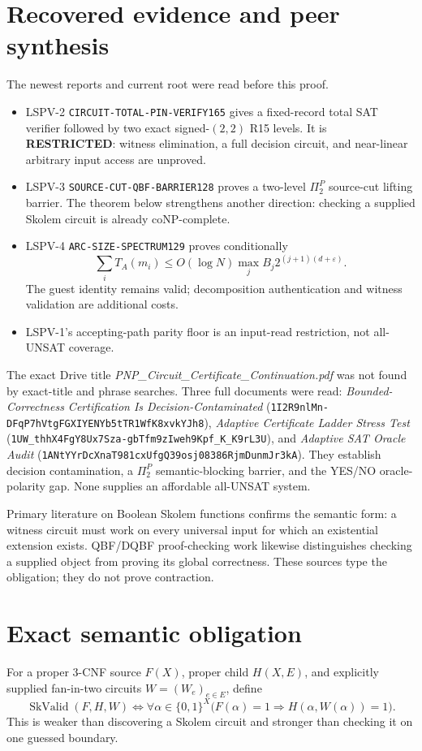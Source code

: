 \documentclass[11pt]{article}
\newcommand{\status}[1]{\textbf{#1}}
\begin{document}
\section*{Recovered evidence and peer synthesis}
The newest reports and current root were read before this proof.
\begin{itemize}
\item LSPV-2 \texttt{CIRCUIT-TOTAL-PIN-VERIFY165} gives a fixed-record
total SAT verifier followed by two exact signed-$(2,2)$ R15 levels.  It is
\status{RESTRICTED}: witness elimination, a full decision circuit, and
near-linear arbitrary input access are unproved.
\item LSPV-3 \texttt{SOURCE-CUT-QBF-BARRIER128} proves a two-level
$\Pi_2^P$ source-cut lifting barrier.  The theorem below strengthens another
direction: checking a supplied Skolem circuit is already coNP-complete.
\item LSPV-4 \texttt{ARC-SIZE-SPECTRUM129} proves conditionally
\[
 \sum_iT_A(m_i)\le O(\log N)\max_jB_j2^{(j+1)(d+\varepsilon)}.
\]
The guest identity remains valid; decomposition authentication and witness
validation are additional costs.
\item LSPV-1's accepting-path parity floor is an input-read restriction, not
all-UNSAT coverage.
\end{itemize}

The exact Drive title \emph{PNP\_Circuit\_Certificate\_Continuation.pdf} was
not found by exact-title and phrase searches.  Three full documents were read:
\emph{Bounded-Correctness Certification Is Decision-Contaminated}
(\texttt{1I2R9nlMn-DFqP7hVtgFGXIYENYb5tTR1WfK8xvkYJh8}),
\emph{Adaptive Certificate Ladder Stress Test}
(\texttt{1UW\_thhX4FgY8Ux7Sza-gbTfm9zIweh9Kpf\_K\_K9rL3U}), and
\emph{Adaptive SAT Oracle Audit}
(\texttt{1ANtYYrDcXnaT981cxUfgQ39osj08386RjmDunmJr3kA}).  They establish
decision contamination, a $\Pi_2^P$ semantic-blocking barrier, and the YES/NO
oracle-polarity gap.  None supplies an affordable all-UNSAT system.

Primary literature on Boolean Skolem functions confirms the semantic form:
a witness circuit must work on every universal input for which an existential
extension exists.  QBF/DQBF proof-checking work likewise distinguishes checking
a supplied object from proving its global correctness.  These sources type the
obligation; they do not prove contraction.

\section*{Exact semantic obligation}
For a proper 3-CNF source $F(X)$, proper child $H(X,E)$, and explicitly
supplied fan-in-two circuits $W=(W_e)_{e\in E}$, define
\[
 \operatorname{SkValid}(F,H,W)\iff
 \forall\alpha\in\{0,1\}^X\bigl(F(\alpha)=1\Rightarrow
 H(\alpha,W(\alpha))=1\bigr).
\]
This is weaker than discovering a Skolem circuit and stronger than checking it
on one guessed boundary.
\end{document}
